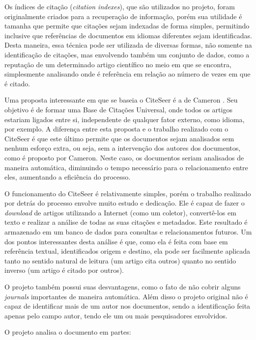 Os índices de citação (\textit{citation indexes}), que são utilizados no projeto, foram originalmente criados para a recuperação de informação, porém sua utilidade é tamanha que permite que citações sejam indexadas de forma simples, permitindo inclusive que referências de documentos em idiomas diferentes sejam identificadas. Desta maneira, essa técnica pode ser utilizada de diversas formas, não somente na identificação de citações, mas envolvendo também um conjunto de dados, como a reputação de um determinado artigo científico no meio em que se encontra, simplesmente analisando onde é referência em relação ao número de vezes em que é citado.

Uma proposta interessante em que se baseia o CiteSeer é a de Cameron \cite{cameron}. Seu objetivo é de formar uma Base de Citações Universal, onde todos os artigos estariam ligados entre si, independente de qualquer fator externo, como idioma, por exemplo. A diferença entre esta proposta e o trabalho realizado com o CiteSeer é que este último permite que os documentos sejam analisados sem nenhum esforço extra, ou seja, sem a intervenção dos autores dos documentos, como é proposto por Cameron. Neste caso, os documentos seriam analisados de maneira automática, diminuindo o tempo necessário para o relacionamento entre eles, aumentando a eficiência do processo.

O funcionamento do CiteSeer é relativamente simples, porém o trabalho realizado por detrás do processo envolve muito estudo e dedicação. Ele é capaz de fazer o \textit{download} de artigos utilizando a Internet (como um coletor), convertê-los em texto e realizar a análise de todas as suas citações e metadados. Este resultado é armazenado em um banco de dados para consultas e relacionamentos futuros. Um dos pontos interessantes desta análise é que, como ela é feita com base em referência textual, identificados origem e destino, ela pode ser facilmente aplicada tanto no sentido natural de leitura (um artigo cita outros) quanto no sentido inverso (um artigo é citado por outros). 

O projeto também possui suas desvantagens, como o fato de não cobrir alguns \textit{journals} importantes de maneira automática. Além disso o projeto original não é capaz de identificar mais de um autor nos documentos, sendo a identificação feita apenas pelo campo autor, tendo ele um ou mais pesquisadores envolvidos.

O projeto analisa o documento em partes:

